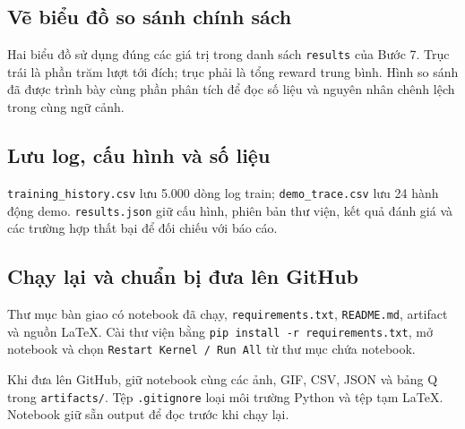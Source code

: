 
\subsection{Vẽ biểu đồ so sánh chính sách}

Hai biểu đồ sử dụng đúng các giá trị trong danh sách \texttt{results} của Bước 7. Trục trái là phần trăm lượt tới đích; trục phải là tổng reward trung bình. Hình so sánh đã được trình bày cùng phần phân tích để đọc số liệu và nguyên nhân chênh lệch trong cùng ngữ cảnh.

\clearpage
\subsection{Lưu log, cấu hình và số liệu}

\texttt{training\_history.csv} lưu 5.000 dòng log train; \texttt{demo\_trace.csv} lưu 24 hành động demo. \texttt{results.json} giữ cấu hình, phiên bản thư viện, kết quả đánh giá và các trường hợp thất bại để đối chiếu với báo cáo.

\subsection{Chạy lại và chuẩn bị đưa lên GitHub}
Thư mục bàn giao có notebook đã chạy, \texttt{requirements.txt}, \texttt{README.md}, artifact và nguồn LaTeX. Cài thư viện bằng \texttt{pip install -r requirements.txt}, mở notebook và chọn \texttt{Restart Kernel / Run All} từ thư mục chứa notebook.

Khi đưa lên GitHub, giữ notebook cùng các ảnh, GIF, CSV, JSON và bảng Q trong \texttt{artifacts/}. Tệp \texttt{.gitignore} loại môi trường Python và tệp tạm LaTeX. Notebook giữ sẵn output để đọc trước khi chạy lại.

